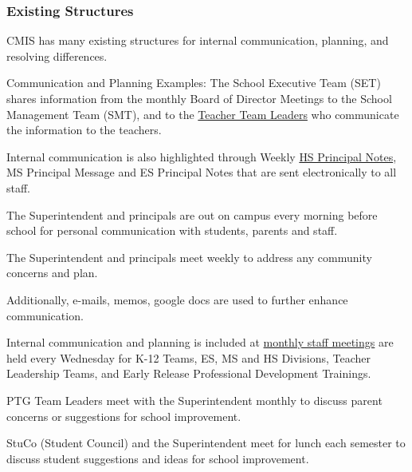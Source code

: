 \subsubsection{Existing Structures}



\begin{findings}

CMIS has many existing structures for internal communication, planning, and resolving differences.

Communication and Planning Examples:
The School Executive Team (SET) shares information from the monthly Board of Director Meetings to the School Management Team (SMT), and to the \href{https://docs.google.com/a/cmis.ac.th/document/d/1iW_tWIwRlWU2p0oIOvd3usDsxj9qYDt_2ROwNPBTHSc/edit?usp=sharing}{Teacher Team Leaders} who communicate the information to the teachers.

Internal communication is also highlighted through Weekly \href{https://docs.google.com/a/cmis.ac.th/document/d/1Jh_VpJ8rfb4_OwmpRw6VZCrIYAuV6A0SP_3NN82KD7A/edit?usp=sharing}{HS Principal Notes}, MS Principal Message and ES Principal Notes that are sent electronically to all staff.

The Superintendent and principals are out on campus every morning before school for personal communication with students, parents and staff.

The Superintendent and principals meet weekly to address any community concerns and plan.

Additionally, e-mails, memos, google docs are used to further enhance communication.


Internal communication and planning is included at \href{https://docs.google.com/a/cmis.ac.th/document/d/1tSEBD59kwf83Z0-m1Q4hzNrVwaJMHdracrghwqoSdW0/edit?usp=sharing}{monthly staff meetings} are held every Wednesday for K-12 Teams, ES, MS and HS Divisions, Teacher Leadership Teams, and Early Release Professional Development Trainings.

PTG Team Leaders meet with the Superintendent monthly to discuss parent concerns or suggestions for school improvement.

StuCo (Student Council) and the Superintendent meet for lunch each semester to discuss student suggestions and ideas for school improvement.


\end{findings}
